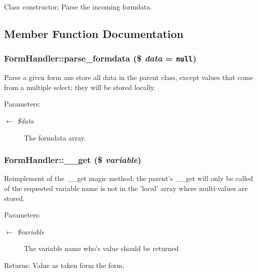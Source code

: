 Class constructor; Parse the incoming formdata. 

\subsection{Member Function Documentation}
\hypertarget{classFormHandler_ef73c198dbc5de4e84f6c2a23b8b294c}{
\subsubsection{\setlength{\rightskip}{0pt plus 5cm}FormHandler::parse\_\-formdata (\$ {\em data} = {\tt null})}}
\label{classFormHandler_ef73c198dbc5de4e84f6c2a23b8b294c}


Parse a given form ans store all data in the parent class, except values that come from a multiple select; they will be stored locally.

\begin{Desc}
\item[Parameters:]
\begin{description}
\item[\mbox{$\leftarrow$} {\em \$data}]The formdata array. \end{description}
\end{Desc}
\hypertarget{classFormHandler_371b8ded5110c6d66bc3a0c3e08fe085}{
\subsubsection{\setlength{\rightskip}{0pt plus 5cm}FormHandler::\_\-\_\-get (\$ {\em variable})}}
\label{classFormHandler_371b8ded5110c6d66bc3a0c3e08fe085}


Reimplement of the \_\-\_\-get magic method; the parent's \_\-\_\-get will only be called of the requested variable name is not in the 'local' array where multi-values are stored.

\begin{Desc}
\item[Parameters:]
\begin{description}
\item[\mbox{$\leftarrow$} {\em \$variable}]The variable name who's value should be returned \end{description}
\end{Desc}
\begin{Desc}
\item[Returns:]Value as taken form the form. \end{Desc}


